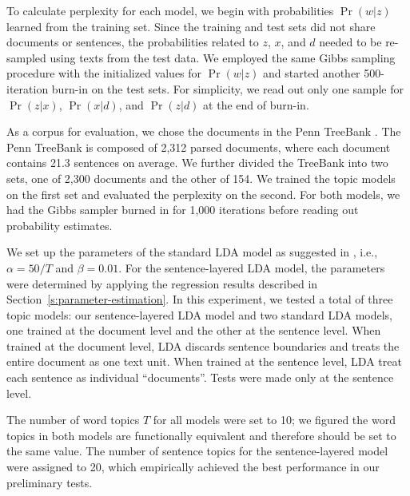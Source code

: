 To calculate perplexity for each model, we begin with probabilities $\Pr(w|z)$
learned from the training set.  Since the training and test sets did not share
documents or sentences, the probabilities related to $z$, $x$, and $d$ needed
to be re-sampled using texts from the test data.  We employed the same Gibbs
sampling procedure with the initialized values for $\Pr(w|z)$ and started
another 500-iteration burn-in on the test sets.  For simplicity, we read out
only one sample for $\Pr(z|x)$, $\Pr(x|d)$, and $\Pr(z|d)$ at the end of
burn-in.

As a corpus for evaluation, we chose the documents in the Penn TreeBank
\cite{marcus1994building}.  The Penn TreeBank is composed of 2,312 parsed
documents, where each document contains 21.3 sentences on average.  We further
divided the TreeBank into two sets, one of 2,300 documents and the other of
154.  We trained the topic models on the first set and evaluated the perplexity
on the second.  For both models, we had the Gibbs sampler burned in for 1,000
iterations before reading out probability estimates.  

We set up the parameters of the standard LDA model as suggested in
\cite{griffiths2004finding}, i.e., $\alpha = 50 / T$ and $\beta = 0.01$.  For
the sentence-layered LDA model, the parameters were determined by applying the
regression results described in Section~\ref{s:parameter-estimation}.  In this
experiment, we tested a total of three topic models: our sentence-layered LDA model and
two standard LDA models, one trained at the document level and the other at the
sentence level.  When trained at the document level, LDA discards sentence
boundaries and treats the entire document as one text unit.  When trained at
the sentence level, LDA treat each sentence as individual ``documents''.  Tests
were made only at the sentence level.  

The number of word topics $T$ for all models were set to 10; we figured the
word topics in both models are functionally equivalent and therefore should be
set to the same value.  The number of sentence topics for the sentence-layered
model were assigned to 20, which empirically achieved the best performance in
our preliminary tests.

